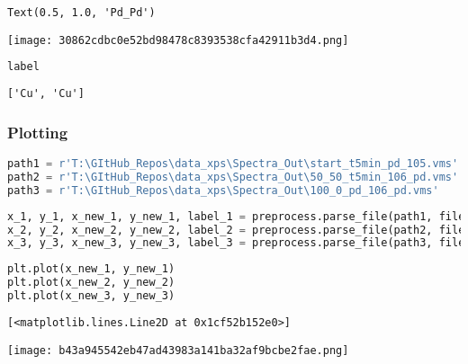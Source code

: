 \begin{lstlisting}
Text(0.5, 1.0, 'Pd_Pd')
\end{lstlisting}

\texttt{[image: 30862cdbc0e52bd98478c8393538cfa42911b3d4.png]}

\begin{lstlisting}[language=Python]
label
\end{lstlisting}

\begin{lstlisting}
['Cu', 'Cu']
\end{lstlisting}

\hypertarget{plotting}{%
\subsubsection*{Plotting}\label{plotting}}

\begin{lstlisting}[language=Python]
path1 = r'T:\GItHub_Repos\data_xps\Spectra_Out\start_t5min_pd_105.vms' # only palladium visible
path2 = r'T:\GItHub_Repos\data_xps\Spectra_Out\50_50_t5min_106_pd.vms'
path3 = r'T:\GItHub_Repos\data_xps\Spectra_Out\100_0_pd_106_pd.vms'
\end{lstlisting}

\begin{lstlisting}[language=Python]
x_1, y_1, x_new_1, y_new_1, label_1 = preprocess.parse_file(path1, filetype='vms', scale=True, N_points=1024)
x_2, y_2, x_new_2, y_new_2, label_2 = preprocess.parse_file(path2, filetype='vms', scale=True, N_points=1024)
x_3, y_3, x_new_3, y_new_3, label_3 = preprocess.parse_file(path3, filetype='vms', scale=True, N_points=1024)
\end{lstlisting}

\begin{lstlisting}[language=Python]
plt.plot(x_new_1, y_new_1)
plt.plot(x_new_2, y_new_2)
plt.plot(x_new_3, y_new_3)
\end{lstlisting}

\begin{lstlisting}
[<matplotlib.lines.Line2D at 0x1cf52b152e0>]
\end{lstlisting}

\texttt{[image: b43a945542eb47ad43983a141ba32af9bcbe2fae.png]}
